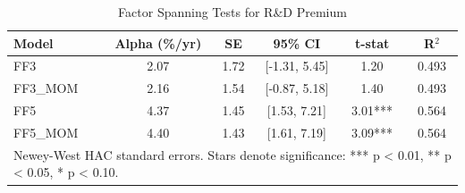 \begin{table}[htbp]
\centering
\caption{Factor Spanning Tests for R\&D Premium}
\label{tab:spanning_tests}
\begin{tabular}{lccccc}
\toprule
Model & Alpha (\%/yr) & SE & 95\% CI & t-stat & R$^2$ \\
\midrule
FF3 & 2.07 & 1.72 & [-1.31, 5.45] & 1.20 & 0.493 \\
FF3\_MOM & 2.16 & 1.54 & [-0.87, 5.18] & 1.40 & 0.493 \\
FF5 & 4.37 & 1.45 & [1.53, 7.21] & 3.01*** & 0.564 \\
FF5\_MOM & 4.40 & 1.43 & [1.61, 7.19] & 3.09*** & 0.564 \\
\bottomrule
\multicolumn{6}{l}{\footnotesize Newey-West HAC standard errors. Stars denote significance: *** p < 0.01, ** p < 0.05, * p < 0.10.} \\
\end{tabular}
\end{table}
